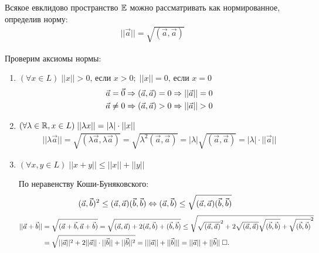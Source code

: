 \documentclass{article}
\begin{document}
\theorem

Всякое евклидово пространство $\E$ можно рассматривать как нормированное, определив норму:
\begin{align*}
	||\vec{a}||=\sqrt{(\vec{a},\vec{a})}
\end{align*}

\proof

Проверим аксиомы нормы:
\begin{enumerate}[label=\Roman*.]
	\item{}$(\forall x\in L)\;||x||>0\text{, если } x>0;\;||x||=0\text{, если }x=0$
	\begin{align*}
		 & \vec{a}=\vec{0}\Rarr (\vec{a},\vec{a})=0\Rarr||\vec{a}||=0 \\
		 & \vec{a}\neq 0\Rarr (\vec{a},\vec{a})>0\Rarr ||\vec{a}||>0
	\end{align*}
	\item{}$(\forall \lambda\in\R,x\in L)\;||\lambda x||=|\lambda|\cdot||x||$
	\begin{align*}
		||\lambda\vec{a}||=\sqrt{(\lambda\vec{a},\lambda\vec{a})}=\sqrt{\lambda^{2}(\vec{a},\vec{a})}=|\lambda|\sqrt{(\vec{a},\vec{a})}=|\lambda|\cdot||\vec{a}||
	\end{align*}
	\item{}$(\forall x,y\in L)\;||x+y||\leq ||x||+||y||$

	По неравенству Коши-Буняковского:
	\begin{align*}
		 & (\vec{a},\vec{b})^{2}\leq(\vec{a},\vec{a})(\vec{b},\vec{b})\Lrarr (\vec{a},\vec{b})\leq\sqrt{(\vec{a},\vec{a})(\vec{b},\vec{b})}
	\end{align*}
	\begin{align*}
		||\vec{a}+\vec{b}||
		 & =\sqrt{(\vec{a}+\vec{b},\vec{a}+\vec{b})}=
		\sqrt{(\vec{a},\vec{a})+2(\vec{a},\vec{b})+(\vec{b},\vec{b})}\leq
		\sqrt{\sqrt{(\vec{a},\vec{a})}^{2}+2\sqrt{(\vec{a},\vec{a})}\sqrt{(\vec{b},\vec{b})}+\sqrt{(\vec{b},\vec{b})}^{2}}            \\
		 & =\sqrt{||\vec{a}||^{2}+2||\vec{a}||\cdot||\vec{b}||+||\vec{b}||^{2}}=|||\vec{a}||+||\vec{b}|||=||\vec{a}||+||\vec{b}||\qed
	\end{align*}
\end{enumerate}
\end{document}
